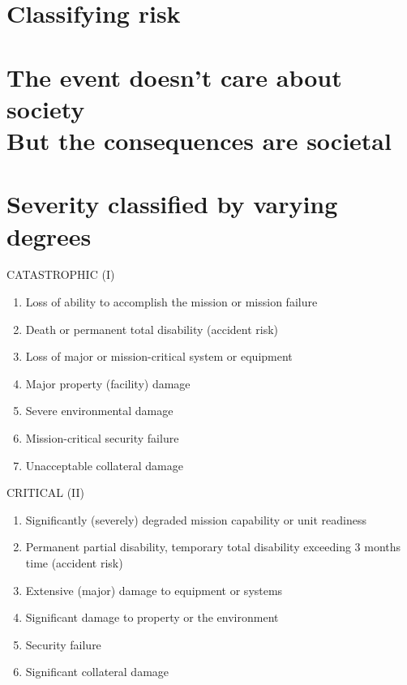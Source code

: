 \documentclass[aspectratio=1610,pdftex,dvipsnames,compress,xcolor={dvipsnames}]{beamer}
\begin{document}
\section{Classifying risk}


\section{The event doesn't care about society\\
         But the consequences are societal
}


\section{Severity classified by varying degrees}


\addtocounter{framenumber}{-3}
\begin{frame}{CATASTROPHIC (I)}
    \begin{enumerate}[series=outerlist,topsep=0pt,itemsep=15pt,leftmargin=*,label=(\arabic*)]
        \item[]Loss of ability to accomplish the mission or mission failure
        \item[]Death or permanent total disability (accident risk)
        \item[]Loss of major or mission-critical system or equipment
        \item[]Major property (facility) damage
        \item[]Severe environmental damage
        \item[]Mission-critical security failure 
        \item[]Unacceptable collateral damage
    \end{enumerate}
\end{frame}


\begin{frame}{CRITICAL (II)}
    \begin{enumerate}[series=outerlist,topsep=0pt,itemsep=15pt,leftmargin=*,label=(\arabic*)]
        \item[]Significantly (severely) degraded mission capability or unit readiness
        \item[]Permanent partial disability, temporary total disability exceeding 3 months time (accident risk)
        \item[]Extensive (major) damage to equipment or systems
        \item[]Significant damage to property or the environment
        \item[]Security failure
        \item[]Significant collateral damage
    \end{enumerate}
\end{frame}
\end{document}

